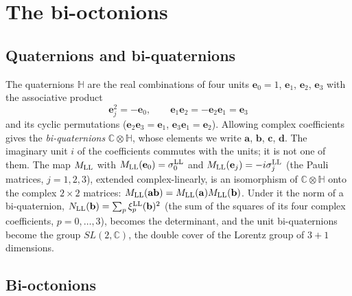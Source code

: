 \section{The bi-octonions}
\label{sec:bioct}

\subsection{Quaternions and bi-quaternions}

The quaternions $\mathbb H$ are the real combinations of four units $\mathbf e_0=1$, $\mathbf e_1$,
$\mathbf e_2$, $\mathbf e_3$ with the associative product
\begin{equation}
\mathbf e_j^2=-\mathbf e_0,\qquad \mathbf e_1\mathbf e_2=-\mathbf e_2\mathbf e_1=\mathbf e_3
\label{eq:quat}
\end{equation}
and its cyclic permutations ($\mathbf e_2\mathbf e_3=\mathbf e_1$, $\mathbf e_3\mathbf e_1=\mathbf e_2$).
Allowing complex coefficients gives the \emph{bi-quaternions} $\mathbb C\otimes\mathbb H$, whose
elements we write $\mathbf a$, $\mathbf b$, $\mathbf c$, $\mathbf d$. The imaginary unit $i$ of the
coefficients commutes with the units; it is not one of them. The map $M_{\rm LL}$ with
$M_{\rm LL}(\mathbf e_0)=\sigma^{\rm LL}_0$ and $M_{\rm LL}(\mathbf e_j)=-i\sigma^{\rm LL}_j$ (the
Pauli matrices, $j=1,2,3$), extended complex-linearly, is an isomorphism of $\mathbb C\otimes\mathbb H$
onto the complex $2\times2$ matrices: $M_{\rm LL}(\mathbf a\mathbf b)=M_{\rm LL}(\mathbf a)M_{\rm
LL}(\mathbf b)$. Under it the norm of a bi-quaternion, $N_{\rm LL}(\mathbf b)=\sum_p\xi^{\rm
LL}_p(\mathbf b)^2$ (the sum of the squares of its four complex coefficients, $p=0,\dots,3$), becomes
the determinant, and the unit bi-quaternions become the group $SL(2,\mathbb C)$, the double cover of
the Lorentz group of $3+1$ dimensions.

\subsection{Bi-octonions}

